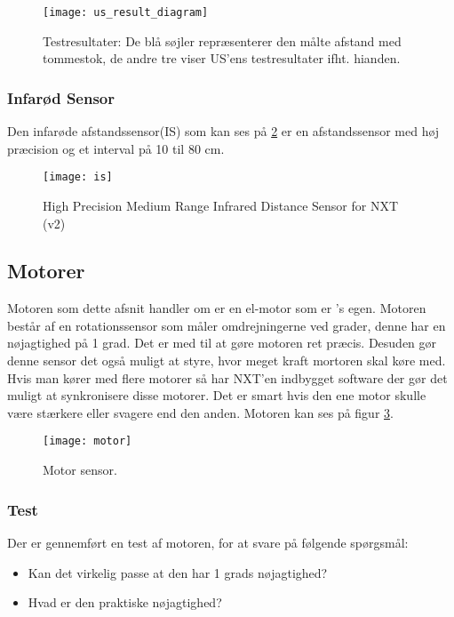 \begin{figure}[h]
\centering
\texttt{[image: us\_result\_diagram]}
\caption{Testresultater: De blå søjler repræsenterer den målte afstand med tommestok, de andre tre viser US'ens testresultater ifht. hianden.}
\label{sensor:ultrasonic_resultat_diagram}
\end{figure}


\subsubsection{Infarød Sensor}
Den infarøde afstandssensor(IS) som kan ses på \ref{sensor:infraroed_sensor} er en afstandssensor med høj præcision og et interval på 10 til 80 cm.

\begin{figure}[h]
\centering
\texttt{[image: is]} 	
\caption{High Precision Medium Range Infrared Distance Sensor for NXT (v2)}
\label{sensor:infraroed_sensor}
\end{figure}

\subsection{Motorer}
Motoren som dette afsnit handler om er en el-motor som er \lego's egen.
Motoren består af en rotationssensor som måler omdrejningerne ved grader, denne har en nøjagtighed på 1 grad. Det er med til at gøre motoren ret præcis. 
Desuden gør denne sensor det også muligt at styre, hvor meget kraft mortoren skal køre med.
Hvis man kører med flere motorer så har NXT'en indbygget software der gør det muligt at synkronisere disse motorer.
Det er smart hvis den ene motor skulle være stærkere eller svagere end den anden.
Motoren kan ses på figur \ref{sensor:motor_sensor}.

\begin{figure}[h]
\centering
\texttt{[image: motor]} 	
\caption{Motor sensor.}
\label{sensor:motor_sensor}
\end{figure}

\subsubsection{Test}
Der er gennemført en test af motoren, for at svare på følgende spørgsmål:

\begin{itemize}
\item Kan det virkelig passe at den har 1 grads nøjagtighed?
\item Hvad er den praktiske nøjagtighed?
\end{itemize}

